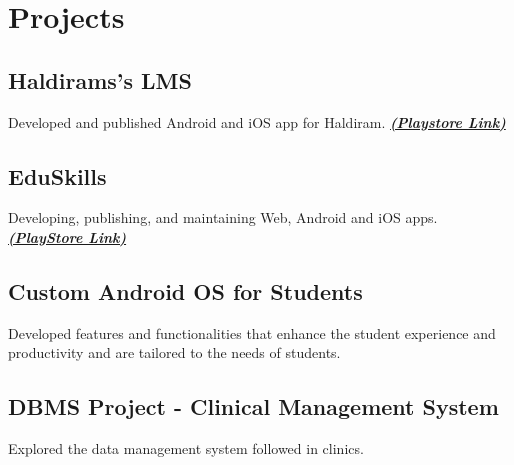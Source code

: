 \documentclass[]{deedy-resume-openfont}
\begin{document}
\begin{minipage}[t]{0.66\textwidth}

\section{Projects}

\subsection{Haldirams's LMS} 
 \textbullet{} Developed and published Android and iOS app for Haldiram. \href{https://play.google.com/store/apps/details?id=com.abhilashkgeorge.haldiram&pli=1}{\bf {\footnotesize \textit{\textbf{(Playstore Link) }}}} \\
 \sectionsep

\subsection{EduSkills}
\textbullet{} Developing, publishing, and maintaining Web, Android and iOS apps. \href{https://play.google.com/store/apps/details?id=com.abhilashkgeorge.eduskills}{\bf {\footnotesize \textit{\textbf{(PlayStore Link) }}}} \\
\sectionsep

\subsection{Custom Android OS for Students}
\textbullet{} Developed features and functionalities that enhance the student experience and productivity and are tailored to the needs of students. \\
\sectionsep

\subsection{DBMS Project - Clinical Management System}
\textbullet{} Explored the data management system followed in clinics. \\
\sectionsep


\end{minipage}
\end{document}
